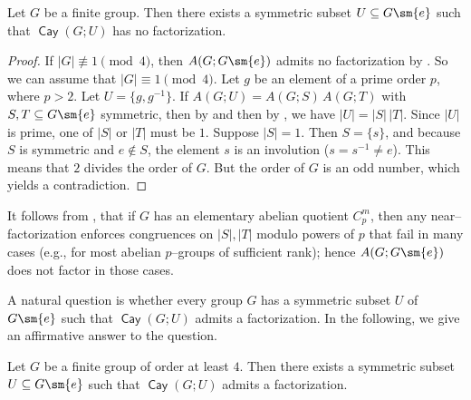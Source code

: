 \documentclass{file}
\newcommand{\cay}{\mathop{\mathsf{Cay}}}
\begin{document}
\begin{thm}
Let $G$ be a finite group.
Then there exists a symmetric subset $U\subseteq G\sm\{e\}$ such that $\cay(G;U)$ has no factorization.
\end{thm}

\begin{proof}
If $|G|\not\equiv 1 \pmod{4}$, then $A(G;G\sm\{e\})$ admits no factorization by \cite[Theorem 1.2]{maghsoudi2023matrix}.
So we can assume that $|G|\equiv 1 \pmod{4}$.
Let $g$ be an element of a prime order $p$, where $p>2$.
Let $U=\{g,g^{-1}\}$.
If  $A(G;U)=A(G;S)\,A(G;T)$ with $S,T\subseteq G\sm\{e\}$ symmetric, then by  and then by ,
we have $|U|=|S|\,|T|$.
Since $|U|$ is prime, one of $|S|$ or $|T|$ must be $1$. Suppose $|S|=1$. Then $S=\{s\}$, and because $S$ is symmetric and $e\notin S$, the element $s$ is an involution ($s=s^{-1}\neq e$).
This means that $2$ divides the order of $G$. But the order of $G$ is an odd number, which yields a contradiction.
\end{proof}


It follows from \cite[Thm.~3]{decaen}, that if $G$ has an elementary abelian quotient $C_p^m$,
then any near–factorization enforces congruences on $|S|,|T|$ modulo powers of $p$ that fail in many cases (e.g., for most abelian $p$–groups of sufficient rank); hence $A(G;G\sm\{e\})$ does not factor in those cases.

A natural question is whether every group $G$ has a symmetric subset $U$ of $G\sm \{e\}$ such that $\cay(G;U)$ admits a factorization.
In the following, we give an affirmative answer to the question.


\begin{thm}
Let $G$ be a finite group of order at least $4$.
Then there exists a symmetric subset $U\subseteq G\sm \{e\}$  such that $\cay(G;U)$ admits a factorization.
\end{thm}
\end{document}
